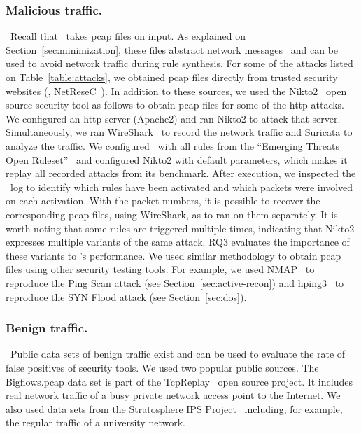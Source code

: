 \documentclass[sigconf,review, anonymous]{acmart}
\begin{document}
\subsubsection{\label{subsec:malicious-traffic}Malicious traffic.}~Recall that \tname\ takes
pcap files on input. As explained on Section~\ref{sec:minimization},
these files abstract network messages~\cite{pcap} and can be used to
avoid network traffic during rule synthesis. For some of the attacks
listed on Table~\ref{table:attacks}, we obtained pcap files directly
from trusted security websites (\eg{},
NetReseC~\cite{pcap-attacks}). In addition to these sources, we used
the Nikto2~\cite{nikto} open source security tool as follows to obtain
pcap files for some of the http attacks. We configured an http server
(Apache2) and ran Nikto2 to attack that server. Simultaneously, we ran
WireShark~\cite{wireshark-net-monitor} to record the network traffic
and Suricata to analyze the traffic. We configured \suri\ with all
rules from the ``Emerging Threats Open
Ruleset''~\cite{emerging-threats-open} and configured Nikto2 with
default parameters, which makes it replay all recorded attacks from
its benchmark. After execution, we inspected the \suri\ log to
identify which rules have been activated and which packets were
involved on each activation. With the packet numbers, it is possible
to recover the corresponding pcap files, using WireShark, as to ran
\tname{} on them separately. It is worth noting that some rules are
triggered multiple times, indicating that Nikto2 expresses multiple
variants of the same attack. RQ3 evaluates the importance of these
variants to \tname{}'s performance. We used similar methodology to
obtain pcap files using other security testing tools. For example, we
used NMAP~\cite{netmap} to reproduce the Ping Scan attack (see
Section~\ref{sec:active-recon}) and hping3~\cite{hping3} to reproduce
the SYN Flood attack (see Section~\ref{sec:dos}).

\vspace{1ex}
\subsubsection{\label{sec:objectanalysis-benign}Benign traffic.}~Public data sets of benign traffic
exist and can be used to evaluate the rate of false positives of
security tools. We used two popular public sources. The Bigflows.pcap
data set is part of the TcpReplay~\cite{tcpreplay} open source
project. It includes real network traffic of a busy private network
access point to the Internet. We also used data sets from the
Stratosphere IPS Project~\cite{stratosphere-normal} including, for
example, the regular traffic of a university network.
\end{document}
